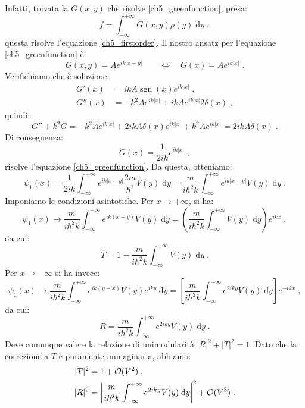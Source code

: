 \documentclass[12pt,a4paper]{report}
\theoremstyle{definition}
\numberwithin{equation}{section}
\newcommand{\diff}[1][]{\mathrm{d}#1}
\begin{document}
Infatti, trovata la $G(x,y)$ che risolve \eqref{ch5_greenfunction}, presa:
$$
f=\int_{-\infty}^{+\infty} G(x,y)\rho(y)\;\diff{y}\;,
$$
questa risolve l'equazione \eqref{ch5_firstorder}. Il nostro ansatz per l'equazione \eqref{ch5_greenfunction} è:
\begin{equation}
G(x,y)=Ae^{ik|x-y|} \qquad \Longleftrightarrow\quad  G(x)=Ae^{ik|x|}\;.
\end{equation}
Verifichiamo che è soluzione:
\begin{align*}
G'(x) &= ikA\operatorname{sgn}(x)e^{ik|x|}\;, \\
G''(x) &= -k^2Ae^{ik|x|}+ikAe^{ik|x|}2\delta(x)\;,
\end{align*}
quindi:
\begin{equation}
G''+k^2G=-k^2Ae^{ik|x|}+2ikA\delta(x)e^{ik|x|}+k^2Ae^{ik|x|}=2ikA\delta(x)\;.
\end{equation}
Di conseguenza:
\begin{equation}
G(x)=\frac{1}{2ik}e^{ik|x|}\;,
\end{equation}
risolve l'equazione \eqref{ch5_greenfunction}. Da questa, otteniamo:
\begin{equation}
\psi_1(x)=\frac{1}{2ik}\int_{-\infty}^{+\infty} e^{ik|x-y|}\frac{2m}{\hbar^2}V(y)\;\diff{y}=\frac{m}{i\hbar^2k}\int_{-\infty}^{+\infty} e^{ik|x-y|}V(y)\;\diff{y}\;.
\end{equation}
Imponiamo le condizioni asintotiche. Per $x\to+\infty$, si ha:
\begin{equation}
\psi_1(x)\to \frac{m}{i\hbar^2k}\int_{-\infty}^{+\infty}e^{ik(x-y)}V(y)\;\diff{y}=\left(\frac{m}{i\hbar^2k}\int_{-\infty}^{+\infty}V(y)\;\diff{y}\right)e^{ikx}\;,
\end{equation}
da cui:
\begin{equation}
T=1+\frac{m}{i\hbar^2k}\int_{-\infty}^{+\infty}V(y)\;\diff{y}\;.
\end{equation}
Per $x\to-\infty$ si ha invece:
\begin{equation}
\psi_1(x)\to \frac{m}{i\hbar^2 k}\int_{-\infty}^{+\infty} e^{ik(y-x)}V(y)e^{iky}\;\diff{y}=\left[\frac{m}{i\hbar^2 k}\int_{-\infty}^{+\infty} e^{2iky}V(y)\;\diff{y}\right]e^{-ikx}\;,
\end{equation}
da cui:
\begin{equation}
R=\frac{m}{i\hbar^2 k}\int_{-\infty}^{+\infty} e^{2iky}V(y)\;\diff{y}\;.
\end{equation}
Deve comunque valere la relazione di unimodularità $|R|^2+|T|^2=1$. Dato che la correzione a $T$ è puramente immaginaria, abbiamo:
\begin{align}
|T|^2&=1+\mathcal{O}(V^2) \label{ch5_t2}\;, \\
|R|^2&=\left|\frac{m}{i\hbar^2 k}\int_{-\infty}^{+\infty} e^{2iky}V(y)\;\diff{y}\right|^2+\mathcal{O}(V^3)\notag \;.
\end{align}
\end{document}
